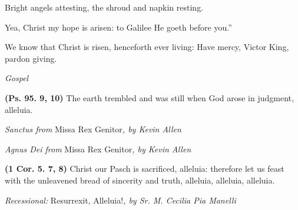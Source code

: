 \documentclass[11pt]{article} %
\begin{document}
Bright angels attesting, the shroud and napkin resting.

Yea, Christ my hope is arisen: to Galilee He goeth before you.''

We know that Christ is risen, henceforth ever living: Have mercy, Victor King, pardon giving.

\vskip10pt
\emph{Gospel}
\vskip20pt

\def\greinitialformat#1{%
{\fontsize{34}{34}\selectfont #1}%
}




\vskip20pt

\def\greinitialformat#1{%
{\fontsize{34}{34}\selectfont #1}%
}




\textbf{(Ps. 95. 9, 10)} The earth trembled and was still when God arose in judgment, alleluia.

\vskip10pt

\emph{Sanctus from} Missa Rex Genitor\emph{, by Kevin Allen}

\emph{Agnus Dei from} Missa Rex Genitor\emph{, by Kevin Allen}

\vskip20pt

\def\greinitialformat#1{%
{\fontsize{34}{34}\selectfont #1}%
}




\textbf{(1 Cor. 5. 7, 8)} Christ our Pasch is sacrificed, alleluia: therefore let us feast with the unleavened bread of sincerity and truth, alleluia, alleluia, alleluia.

\vskip10pt

\emph{Recessional:} Resurrexit, Alleluia!\emph{, by Sr. M. Cecilia Pia Manelli}
\end{document}
